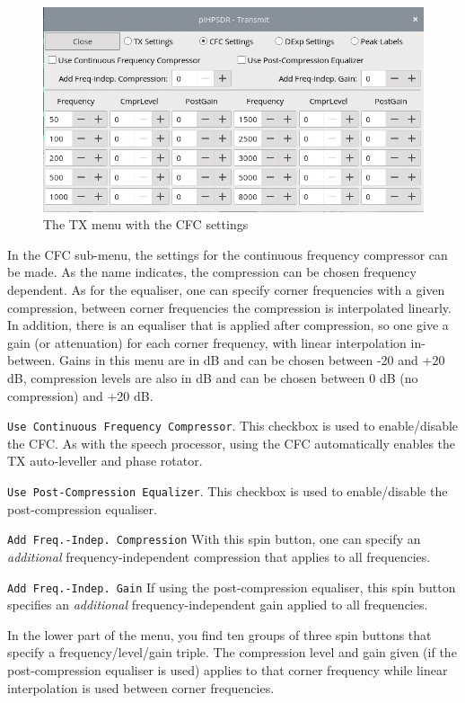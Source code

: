 \documentclass[12pt]{book}
\def\rett#1{\texttt{\color{red}#1}}
\begin{document}
\begin{figure}[ht]
\center
\includegraphics[scale=0.45]{TX_CFC.png}
\caption{The TX menu with the CFC settings}
\label{fig:CFCmenu}
\end{figure}

In the CFC sub-menu, the settings for the continuous frequency compressor can be made.
As the name indicates, the compression can be chosen frequency dependent. As for the
equaliser, one can specify corner frequencies with a given compression, between corner
frequencies the compression is interpolated linearly. In addition, there is an equaliser that
is applied after compression, so one give a gain (or attenuation) for each corner
frequency, with linear interpolation in-between. Gains in this menu are in dB and
can be chosen between -20 and +20 dB, compression levels are also in dB and can be chosen
between 0 dB (no compression) and +20 dB.

\rett{Use Continuous Frequency Compressor}. This checkbox is used to enable/disable the CFC. As with
the speech processor, using the CFC automatically enables the TX auto-leveller and phase rotator.

\rett{Use Post-Compression Equalizer}. This checkbox is used  to enable/disable the post-compression
equaliser.

\rett{Add Freq.-Indep. Compression} With this spin button, one can specify an \textit{additional}
frequency-independent compression that applies to all frequencies.

\rett{Add Freq.-Indep. Gain} If using the post-compression equaliser, this spin button specifies an
\textit{additional} frequency-independent gain applied to all frequencies.

In the lower part of the menu, you find ten groups of three spin buttons that specify a frequency/level/gain
triple. The compression level and gain given (if the post-compression equaliser is used) applies to that
corner frequency while linear interpolation is used between corner frequencies.
\end{document}
